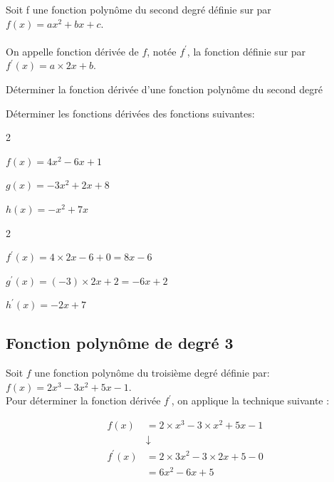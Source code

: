 \begin{definition}
	Soit f une fonction polynôme du second degré définie sur \R par
	$f(x)=ax^2+bx+c$.\\
	\ \\
	On appelle fonction dérivée de $f$, notée $f^{\prime}$, la fonction définie sur \R par $f^{\prime}(x)=a \times 2 x+b$.
\end{definition}

\begin{methodeTitre}{Déterminer la fonction dérivée d'une fonction polynôme du second degré}
	
	Déterminer les fonctions dérivées des fonctions suivantes:
	\begin{enumMet}
		\begin{multicols}{2}
			\item $f(x)=4 x^{2}-6 x+1$
			\item $g(x)=-3 x^{2}+2 x+8$
			\item $h(x)=-x^{2}+7 x$
		\end{multicols}
		
	\end{enumMet}
	
	\grasInMet{Solution :}
	\begin{enumMet}
		\begin{multicols}{2}
			\item $f^{\prime}(x)=4 \times 2 x-6+0=8 x-6$
			\item $g^{\prime}(x)=(-3) \times 2 x+2=-6 x+2$
			\item $h^{\prime}(x)=-2 x+7$
		\end{multicols}
	\end{enumMet}
\end{methodeTitre}

\subsection{Fonction polynôme de degré 3}
Soit $f$ une fonction polynôme du troisième degré définie par:\\
$f(x)=2 x^{3}-3 x^{2}+5 x-1$.\\
Pour déterminer la fonction dérivée $f^{\prime}$, on applique la technique suivante :

$$
\begin{aligned}
	f(x)&=2 \times x^{3}-3 \times x^{2}+5 x-1 \\
	& \downarrow \\
	f^{\prime}(x)&=2 \times 3 x^{2}-3 \times 2 x+5-0 \\
	&=6 x^{2}-6 x+5
\end{aligned}
$$

